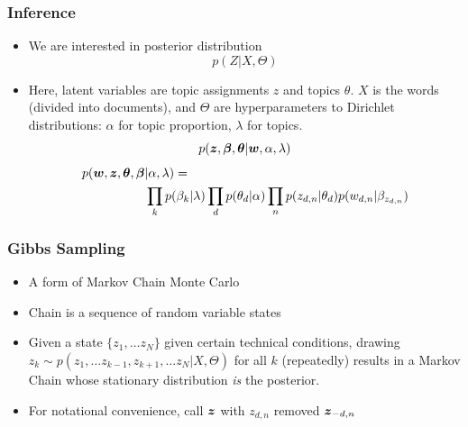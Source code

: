 \documentclass[xcolor=dvipsnames]{beamer}
\newcommand{\bm}[1]{\mbox{\boldmath$#1$}}
\begin{document}
\begin{frame}
\frametitle{Inference}

\begin{itemize}
\item We are interested in posterior distribution
\begin{equation}
p(Z | X, \Theta)
\end{equation}
\pause
\item Here, latent variables are topic assignments $z$ and topics $\theta$.  $X$ is the words (divided into documents), and $\Theta$ are hyperparameters to Dirichlet distributions: $\alpha$ for topic proportion, $\lambda$ for topics.
\begin{equation}
p({\bm z}, {\bm \beta}, {\bm \theta} | {\bm w}, \alpha, \lambda)
\end{equation}
\pause
\begin{align*}
p({\bm w}, {\bm z}, {\bm \theta}, {\bm \beta} & | \alpha, \lambda) = \\
& \prod_{k} p(\beta_k | \lambda) \prod_{d} p(\theta_d | \alpha) \prod_{n}
p(z_{d,n} | \theta_d) p(w_{d,n} | \beta_{z_{d,n}})
\end{align*}
\end{itemize}
\end{frame}



\begin{frame}
\frametitle{Gibbs Sampling}
\begin{itemize}
\item A form of Markov Chain Monte Carlo
\item Chain is a sequence of random variable states
\item Given a state $\{z_1, \dots z_N\}$ given certain technical conditions, drawing $z_k \sim p(z_1, \dots z_{k-1}, z_{k+1}, \dots z_N | X, \Theta)$ for all $k$ (repeatedly) results in a Markov Chain whose stationary distribution \emph{is} the posterior.
\item For notational convenience, call ${\bm z}$ with $z_{d,n}$ removed ${\bm z}_{-d,n}$
\end{itemize}
\end{frame}
\end{document}
